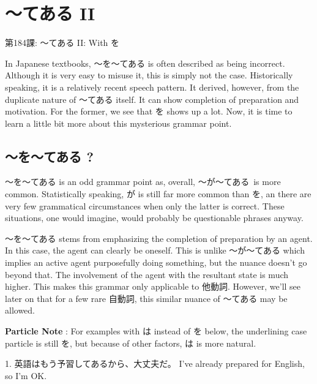    
\chapter{～てある II}

\begin{center}
\begin{Large}
第184課: ～てある II: With を 
\end{Large}
\end{center}
 
\par{ In Japanese textbooks, ～を～てある is often described as being incorrect. Although it is very easy to misuse it, this is simply not the case. Historically speaking, it is a relatively recent speech pattern. It derived, however, from the duplicate nature of ～てある itself. It can show completion of preparation and motivation. For the former, we see that を shows up a lot. Now, it is time to learn a little bit more about this mysterious grammar point. }
      
\section{～を～てある ?}
 
\par{ ～を～てある is an odd grammar point as, overall, ～が～てある is more common. Statistically speaking, が is still far more common than を, an there are very few grammatical circumstances when only the latter is correct. These situations, one would imagine, would probably be questionable phrases anyway. }

\par{ ～を～てある stems from emphasizing the completion of preparation by an agent. In this case, the agent can clearly be oneself. This is unlike ～が～てある which implies an active agent purposefully doing something, but the nuance doesn't go beyond that. The involvement of the agent with the resultant state is much higher. This makes this grammar only applicable to 他動詞. However, we'll see later on that for a few rare 自動詞, this similar nuance of ～てある may be allowed. }

\par{\textbf{Particle Note }: For examples with は instead of を below, the underlining case particle is still を, but because of other factors, は is more natural. }

\par{1. 英語はもう予習してあるから、大丈夫だ。 \hfill\break
I've already prepared for English, so I'm OK. }

